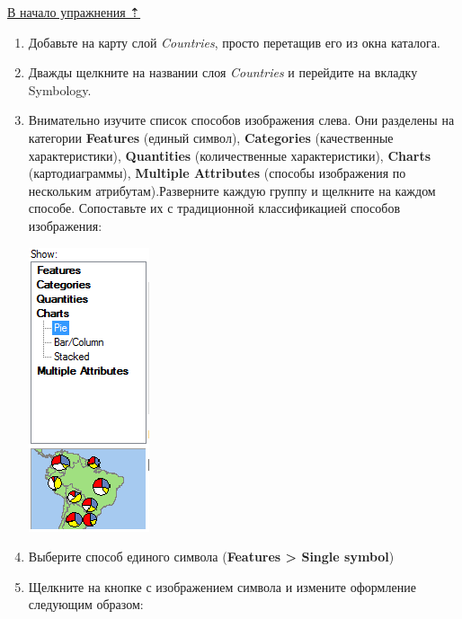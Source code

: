 \documentclass[]{book}
\theoremstyle{definition}
\theoremstyle{definition}
\theoremstyle{definition}
\theoremstyle{remark}
\begin{document}
\protect\hyperlink{map-design-climates}{В начало упражнения ⇡}

\begin{enumerate}
\def\labelenumi{\arabic{enumi}.}
\item
  Добавьте на карту слой \emph{Countries}, просто перетащив его из окна
  каталога.
\item
  Дважды щелкните на названии слоя \emph{Countries} и перейдите на
  вкладку Symbology.
\item
  Внимательно изучите список способов изображения слева. Они разделены
  на категории \textbf{Features} (единый символ), \textbf{Categories}
  (качественные характеристики), \textbf{Quantities} (количественные
  характеристики), \textbf{Charts} (картодиаграммы), \textbf{Multiple
  Attributes} (способы изображения по нескольким атрибутам).Разверните
  каждую группу и щелкните на каждом способе. Сопоставьте их с
  традиционной классификацией способов изображения:

  \includegraphics{images/Ex03/image12.png}
\item
  Выберите способ единого символа (\textbf{Features \textgreater{}
  Single symbol})
\item
  Щелкните на кнопке с изображением символа и измените оформление
  следующим образом:


\end{enumerate}
\end{document}
